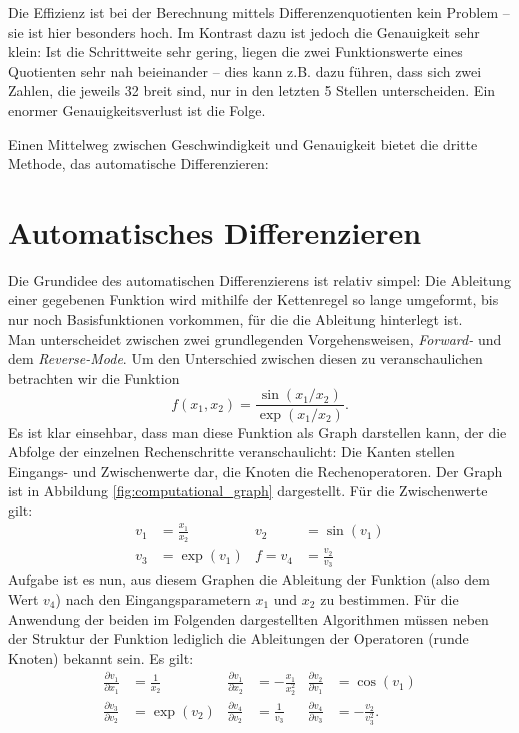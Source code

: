 \documentclass{scrartcl}
\begin{document}
Die Effizienz ist bei der Berechnung mittels Differenzenquotienten kein Problem -- sie ist hier besonders hoch. Im Kontrast dazu ist jedoch die Genauigkeit sehr klein: Ist die Schrittweite sehr gering, liegen die zwei Funktionswerte eines Quotienten sehr nah beieinander -- dies kann z.B. dazu führen, dass sich zwei Zahlen, die jeweils \SI{32}{\Bit} breit sind, nur in den letzten 5 Stellen unterscheiden. Ein enormer Genauigkeitsverlust ist die Folge.\par
Einen Mittelweg zwischen Geschwindigkeit und Genauigkeit bietet die dritte Methode, das automatische Differenzieren:
\section{Automatisches Differenzieren}
Die Grundidee des automatischen Differenzierens ist relativ simpel: Die Ableitung einer gegebenen Funktion wird mithilfe der Kettenregel so lange umgeformt, bis nur noch Basisfunktionen vorkommen, für die die Ableitung hinterlegt ist.\\
Man unterscheidet zwischen zwei grundlegenden Vorgehensweisen, \emph{Forward-} und dem \emph{Reverse-Mode}.
Um den Unterschied zwischen diesen zu veranschaulichen betrachten wir die Funktion 
\begin{equation}
f(x_1, x_2) = \frac{\sin(x_1/x_2)}{\exp(x_1/x_2)}. \label{eq:example_func}
\end{equation}
Es ist klar einsehbar, dass man diese Funktion als Graph darstellen kann, der die Abfolge der einzelnen Rechenschritte veranschaulicht: Die Kanten stellen Eingangs- und Zwischenwerte dar, die Knoten die Rechenoperatoren. Der Graph ist in Abbildung \ref{fig:computational_graph} dargestellt. Für die Zwischenwerte gilt:
\begin{equation*}
\begin{aligned}
	v_1 &= \frac{x_1}{x_2} &
	v_2 &= \sin(v_1) \\
	v_3 &= \exp(v_1) &
	f = v_4 &= \frac{v_2}{v_3}
\end{aligned}
\end{equation*}
Aufgabe ist es nun, aus diesem Graphen die Ableitung der Funktion (also dem Wert $v_4$) nach den Eingangsparametern $x_1$ und $x_2$ zu bestimmen. Für die Anwendung der beiden im Folgenden dargestellten Algorithmen müssen neben der Struktur der Funktion lediglich die Ableitungen der Operatoren (runde Knoten) bekannt sein. Es gilt:
\begin{equation*}
\begin{aligned}
	\tfrac{\partial v_1}{\partial x_1} &= \tfrac{1}{x_2} &
	\tfrac{\partial v_1}{\partial x_2} &= -\tfrac{x_1}{x_2^2} &
	\tfrac{\partial v_2}{\partial v_1} &= \cos(v_1) \\
	\tfrac{\partial v_3}{\partial v_2} &= \exp(v_2) &
	\tfrac{\partial v_4}{\partial v_2} &= \tfrac{1}{v_3} &
	\tfrac{\partial v_4}{\partial v_3} &= -\tfrac{v_2}{v_3^2}.
\end{aligned}
\end{equation*}
\end{document}
